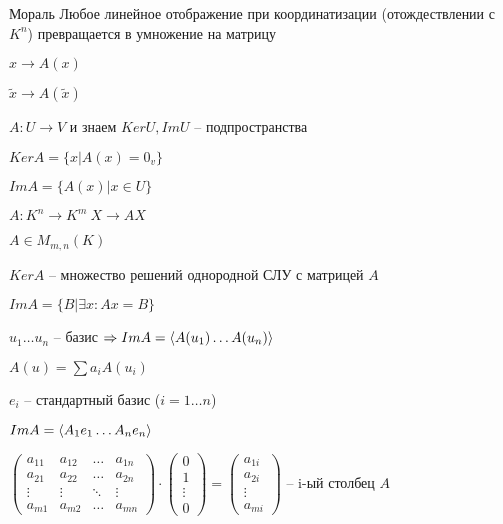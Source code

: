 \documentclass[12pt]{article}
\begin{document}
\begin{Remark}{Мораль}
    Любое линейное отображение при координатизации (отождествлении с $K^n$) превращается в умножение на матрицу

    $x \rightarrow A(x)$

    $\tilde{x} \rightarrow A(\tilde{x})$
\end{Remark}

$A : U \rightarrow V$ и знаем $KerU, ImU$ -- подпространства

$KerA = \{ x | A(x) = 0_v \}$

$ImA = \{ A(x) | x \in U \}$

$A : K^n \rightarrow K^m\ X \rightarrow AX$

$A \in M_{m, n}(K)$

$KerA$ -- множество решений однородной СЛУ с матрицей $A$

$ImA = \{ B | \exists x : Ax = B \}$

$u_1 \ldots u_n$ -- базис $\Rightarrow ImA = \langle A(u_1) \ldots A(u_n) \rangle$

$A(u) = \sum a_iA(u_i)$

$e_i$ -- стандартный базис ($i = 1 \ldots n$)

$ImA = \langle A_1e_1 \ldots A_ne_n \rangle$

$\begin{pmatrix}
    a_{11} & a_{12} & \ldots & a_{1n} \\
    a_{21} & a_{22} & \ldots & a_{2n} \\
    \vdots & \vdots & \ddots & \vdots \\
    a_{m1} & a_{m2} & \ldots & a_{mn}
\end{pmatrix} \cdot \begin{pmatrix}
    0 \\
    1 \\
    \vdots \\
    0
\end{pmatrix} = \begin{pmatrix}
    a_{1i} \\
    a_{2i} \\
    \vdots \\
    a_{mi}
\end{pmatrix}$ -- i-ый столбец $A$
\end{document}
